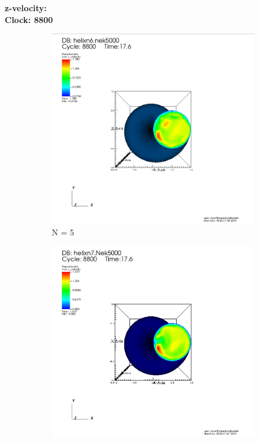 \documentclass[12pt]{article}
\begin{document}
\noindent \textbf{z-velocity:}\\
\textbf{Clock: 8800}
\begin{figure}[h]
	\centering
	\begin{subfigure}[h]{0.400\textwidth}
		\centering
		\includegraphics[width=\textwidth]{z6c8800.png}
		\caption{N = 5}
	\end{subfigure}
	\begin{subfigure}[h]{0.400\textwidth}
		\centering
		\includegraphics[width=\textwidth]{z7c8800.png}

\end{subfigure}
\end{figure}
\end{document}
